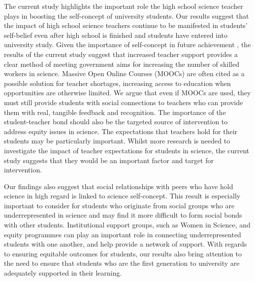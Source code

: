 The current study highlights the important role the high school science teacher plays in boosting the self-concept of university students. Our results suggest that the impact of high school science teachers continue to be manifested in students' self-belief even after high school is finished and students have entered into university study. Given the importance of self-concept in future achievement \cite{uccar2017role,chang2008science}, the results of the current study suggest that increased teacher support provides a clear method of meeting government aims for increasing the number of skilled workers in science. Massive Open Online Courses (MOOCs) are often cited as a possible solution for teacher shortages, increasing access to education when opportunities are otherwise limited. We argue that even if MOOCs are used, they must still provide students with social connections to teachers who can provide them with real, tangible feedback and recognition. The importance of the student-teacher bond should also be the targeted source of intervention to address equity issues in science. The expectations that teachers hold for their students may be particularly important.\cite{rubie2006teacher} Whilst more research is needed to investigate the impact of teacher expectations for students in science, the current study suggests that they would be an important factor and target for intervention.

Our findings also suggest that social relationships with peers who have hold science in high regard is linked to science self-concept. This result is especially important to consider for students who originate from social groups who are underrepresented in science and may find it more difficult to form social bonds with other students. Institutional support groups, such as Women in Science, and equity programmes can play an important role in connecting underrepresented students with one another, and help provide a network of support.  With regards to ensuring equitable outcomes for students, our results also bring attention to the need to ensure that students who are the first generation to university are adequately supported in their learning.  

